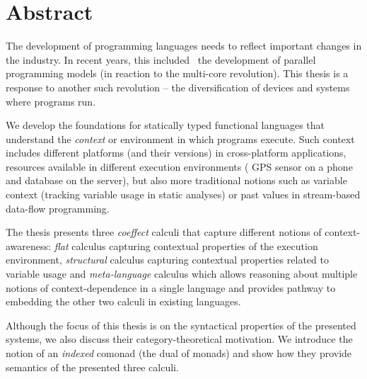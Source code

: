 

\begingroup
\let\clearpage\relax
\let\cleardoublepage\relax
\let\cleardoublepage\relax

\chapter*{Abstract} %
The development of programming languages needs to reflect important changes in the industry.
In recent years, this included \eg~the development of parallel programming models (in reaction 
to the multi-core revolution). This thesis is a response to another such revolution -- the 
diversification of devices and systems where programs run. 

We develop the foundations for statically typed functional languages that understand 
the \emph{context} or environment in which programs execute. Such context includes different 
platforms (and their versions) in cross-platform applications, resources available in different 
execution environments (\eg \; GPS sensor on a phone and database on the server), but also more 
traditional notions such as variable context (tracking variable usage in static analyses) or 
past values in stream-based data-flow programming.

The thesis presents three \emph{coeffect} calculi that capture different notions of 
context-awareness: \emph{flat} calculus capturing contextual properties of the execution 
environment, \emph{structural} calculus capturing contextual properties related to 
variable usage and \emph{meta-language} calculus which allows reasoning about multiple notions
of context-dependence in a single language and provides pathway to embedding the other two
calculi in existing languages.

Although the focus of this thesis is on the syntactical properties of the presented 
systems, we also discuss their category-theoretical motivation. We introduce the notion of
an \emph{indexed} comonad (the dual of monads) and show how they provide semantics of the
presented three calculi. 

\endgroup			

\vfill